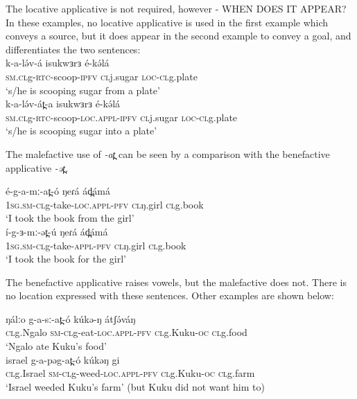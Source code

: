 The locative applicative is not required, however - WHEN DOES IT APPEAR? In these examples, no locative applicative is used in the first example which conveys a source, but it does appear in the second example to convey a goal, and differentiates the two sentences:\\
\ea
\ea \gll k-a-lə́v-á 			isukwɜrɜ 		é-kə́lá	\\
	\textsc{sm.cl}g-\textsc{rtc}-scoop-\textsc{ipfv}	\textsc{cl}j.sugar		\textsc{loc-cl}g.plate\\
	\trans ‘s/he is scooping sugar from a plate’\\

\ex \gll k-a-lə́v-át̪-a 				isukwɜrɜ 	é-kə́lá	\\
		\textsc{sm.cl}g-\textsc{rtc}-scoop-\textsc{loc.appl}-\textsc{ipfv}	\textsc{cl}j.sugar	\textsc{loc-cl}g.plate\\
	\trans ‘s/he is scooping sugar into a plate’\\
\z
\z



The malefactive use of \textit{-at̪} can be seen by a comparison with the benefactive applicative \textit{-ət̪}.

\ea
\ea \gll é-g-a-mː-at̪-ó 				ŋeɾá 		ád̪ámá  \\
	1\textsc{sg.sm-cl}g-take-\textsc{loc.appl-\textsc{pfv}}		\textsc{cl}ŋ.girl		\textsc{cl}g.book	\\
	\trans ‘I took the book from the girl’\\

\ex	\gll í-g-ɜ-mː-ət̪-ú 				ŋeɾá 		ád̪ámá    \\
	1\textsc{sg.sm-cl}g-take-\textsc{appl-\textsc{pfv}}		\textsc{cl}ŋ.girl		\textsc{cl}g.book	\\
	\trans ‘I took the book for the girl’\\
\z
\z

The benefactive applicative raises vowels, but the malefactive does not. There is no location expressed with these sentences. Other examples are shown below:

\ea
\ea	\gll ŋálːo		g-a-sː-at̪-ó 			kúkə-ŋ 		átʃə́váŋ\\
	\textsc{cl}g.Ngalo	\textsc{sm-cl}g-eat-\textsc{loc.appl-\textsc{pfv}}	\textsc{cl}g.Kuku-\textsc{oc}	\textsc{cl}g.food\\
	\trans	‘Ngalo ate Kuku’s food’\\

\ex \gll israel 		g-a-pəg-at̪-ó 			kúkəŋ 		gi\\
	\textsc{cl}g.Israel	\textsc{sm-cl}g-weed-\textsc{loc.appl-\textsc{pfv}}	\textsc{cl}g.Kuku-\textsc{oc}	\textsc{cl}g.farm\\
	\trans	‘Israel weeded Kuku’s farm’ (but Kuku did not want him to)\\
\z
\z

